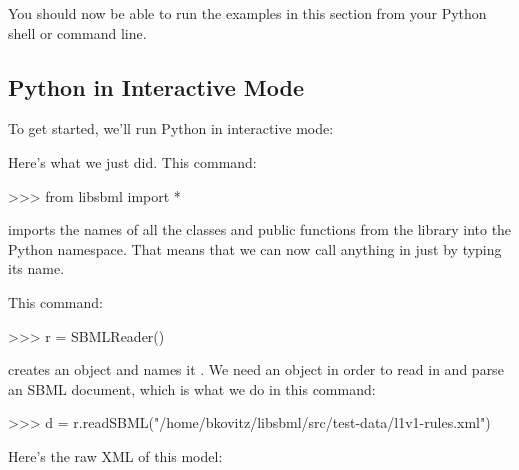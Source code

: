 \documentclass{sbmlmanual}
\begin{document}
You should now be able to run the examples in this section from your Python
shell or command line.


\subsection{Python in Interactive Mode}
\label{sec:python-interactive}

To get started, we'll run Python in interactive mode:


Here's what we just did.  This command:

\begin{shellVerbatim}
>>> from libsbml import *
\end{shellVerbatim}

imports the names of all the classes and public functions
from the \libsbml{} library into the Python namespace.  That
means that we can now call anything in \libsbml{} just by
typing its name.

This command:

\begin{shellVerbatim}
>>> r = SBMLReader()
\end{shellVerbatim}

creates an  object and names it .  We need an
 object in order to read in and parse an SBML
document, which is what we do in this command:

\begin{shellVerbatim}
>>> d = r.readSBML("/home/bkovitz/libsbml/src/test-data/l1v1-rules.xml")
\end{shellVerbatim}

Here's the raw XML of this model:
\end{document}
